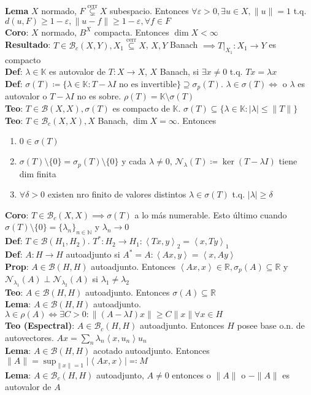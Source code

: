 \documentclass[9pt]{extarticle}
\newcommand{\N}{\mathbb{N}}
\newcommand{\R}{\mathbb{R}}
\newcommand{\K}{\mathbb{K}}
\newcommand{\inn}[1]{\left\langle #1\right\rangle}
\begin{document}
\begin{multicols*}{2}
\begin{enumerate}
\end{enumerate}
\textbf{Lema} $X$ normado, $F\overset{\text{cerr}}{\subsetneq} X$ subespacio. Entonces $\forall \varepsilon>0,\exists u\in X,\|u\|=1$ t.q. $d(u,F)\geq 1-\varepsilon, \|u-f\|\geq 1-\varepsilon,\forall f\in F$\\
\textbf{Coro}: $X$ normado, $B^X$ compacta. Entonces $\operatorname{dim}X<\infty$\\
\textbf{Resultado}: $T\in\mathcal{B}_c(X,Y), X_1\overset{\text{cerr}}{\subseteq}X$, $X,Y$ Banach $\implies T\big|_{X_1}:X_1\to Y$ es compacto\\
\textbf{Def}: $\lambda\in\K$ es autovalor de $T:X\to X$, $X$ Banach, si $\exists x\neq 0$ t.q. $Tx=\lambda x$\\
\textbf{Def}: $\sigma(T)\coloneqq \{\lambda\in\K:T-\lambda I\text{ no es invertible}\}\supseteq \sigma_p(T)$. $\lambda\in \sigma(T)\iff$ o $\lambda$ es autovalor o $T-\lambda I$ no es sobre. $\rho(T)=\K\setminus \sigma(T)$\\
\textbf{Teo}: $T\in\mathcal{B}(X,X), \sigma(T)$ es compacto de $\K$. $\sigma(T)\subseteq \{\lambda\in\K:|\lambda|\leq \|T\|\}$\\
\textbf{Teo}: $T\in\mathcal{B}_c(X,X), X$ Banach, $\operatorname{dim} X=\infty$. Entonces \begin{enumerate}
	\item $0\in\sigma(T)$
	\item $\sigma(T)\setminus\{0\}=\sigma_p(T)\setminus\{0\}$ y cada $\lambda\neq 0$, $\mathcal{N}_\lambda(T)\coloneqq \operatorname{ker}(T-\lambda I)$ tiene dim finita 
	\item $\forall \delta>0$ existen nro finito de valores distintos $\lambda\in\sigma(T)$ t.q. $|\lambda|\geq \delta$
\end{enumerate}
\textbf{Coro}: $T\in\mathcal{B}_c(X,X)\implies \sigma(T)$ a lo más numerable. Esto último cuando $\sigma(T)\setminus\{0\}=\{\lambda_n\}_{n\in\N}$ y $\lambda_n\to 0$\\
\textbf{Def}: $T\in\mathcal{B}(H_1,H_2)$. $T^*:H_2\to H_1:\inn{Tx,y}_2=\inn{x,Ty}_1$\\
\textbf{Def}: $A:H\to H$ autoadjunto si $A^*=A: \inn{Ax,y}=\inn{x,Ay}$\\
\textbf{Prop}: $A\in\mathcal{B}(H,H)$ autoadjunto. Entonces $\inn{Ax,x}\in\R, \sigma_p(A)\subseteq \R$ y $\mathcal{N}_{\lambda_1}(A)\perp\mathcal{N}_{\lambda_2}(A)$ si $\lambda_1\neq\lambda_2$\\
\textbf{Teo}: $A\in\mathcal{B}(H,H)$ autoadjunto. Entonces $\sigma(A)\subseteq \R$\\
\textbf{Lema}: $A\in\mathcal{B}(H,H)$ autoadjunto. $\lambda\in\rho(A)\iff \exists C>0:\|(A-\lambda I)x\|\geq C\|x\|\forall x\in H$\\
\textbf{Teo (Espectral)}: $A\in\mathcal{B}_c(H,H)$ autoadjunto. Entonces $H$ posee base o.n. de autovectores. $Ax=\sum_n \lambda_n\inn{x,u_n}u_n$\\
\textbf{Lema}: $A\in\mathcal{B}(H,H)$ acotado autoadjunto. Entonces $\|A\|=\sup_{\|x\|=1}|\inn{Ax,x}|\eqqcolon M$\\
\textbf{Lema}: $A\in\mathcal{B}_c(H,H)$ autoadjunto, $A\neq 0$ entonces o $\|A\|$ o $-\|A\|$ es autovalor de $A$

\end{multicols*}
\end{document}
